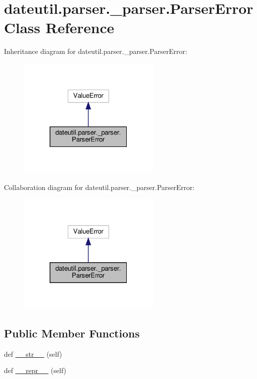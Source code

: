 \hypertarget{classdateutil_1_1parser_1_1__parser_1_1ParserError}{}\section{dateutil.\+parser.\+\_\+parser.\+Parser\+Error Class Reference}
\label{classdateutil_1_1parser_1_1__parser_1_1ParserError}


Inheritance diagram for dateutil.\+parser.\+\_\+parser.\+Parser\+Error\+:
\nopagebreak
\begin{figure}[H]
\begin{center}
\leavevmode
\includegraphics[width=196pt]{classdateutil_1_1parser_1_1__parser_1_1ParserError__inherit__graph}
\end{center}
\end{figure}


Collaboration diagram for dateutil.\+parser.\+\_\+parser.\+Parser\+Error\+:
\nopagebreak
\begin{figure}[H]
\begin{center}
\leavevmode
\includegraphics[width=196pt]{classdateutil_1_1parser_1_1__parser_1_1ParserError__coll__graph}
\end{center}
\end{figure}
\subsection*{Public Member Functions}
\begin{DoxyCompactItemize}
\item 
def \hyperlink{classdateutil_1_1parser_1_1__parser_1_1ParserError_aa4bdb35b29f19a7219533461c7a49c76}{\+\_\+\+\_\+str\+\_\+\+\_\+} (self)
\item 
def \hyperlink{classdateutil_1_1parser_1_1__parser_1_1ParserError_a66a21b4ebb69c331f44145c0952f568e}{\+\_\+\+\_\+repr\+\_\+\+\_\+} (self)
\end{DoxyCompactItemize}



